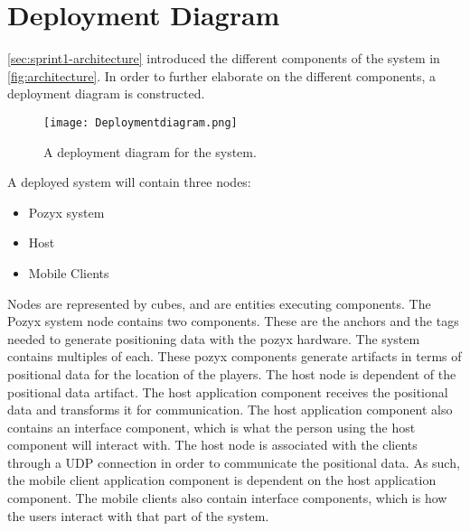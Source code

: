 \section{Deployment Diagram}\label{sec:sprint2-deploymentdia}
\autoref{sec:sprint1-architecture} introduced the different components of the system in \autoref{fig:architecture}.
In order to further elaborate on the different components, a deployment diagram is constructed.
\begin{figure}[H]
    \centering
    \texttt{[image: Deploymentdiagram.png]}
    \caption{A deployment diagram for the system.}
    \label{fig:sprint2-deployment}
\end{figure}
\noindent
A deployed system will contain three nodes:
\begin{itemize}
    \item Pozyx system
    \item Host
    \item Mobile Clients
\end{itemize}
Nodes are represented by cubes, and are entities executing components.
The Pozyx system node contains two components.
These are the anchors and the tags needed to generate positioning data with the pozyx hardware.
The system contains multiples of each.
These pozyx components generate artifacts in terms of positional data for the location of the players.
The host node is dependent of the positional data artifact.
The host application component receives the positional data and transforms it for communication.
The host application component also contains an interface component, which is what the person using the host component will interact with.
The host node is associated with the clients through a UDP connection in order to communicate the positional data.
As such, the mobile client application component is dependent on the host application component.
The mobile clients also contain interface components, which is how the users interact with that part of the system.
